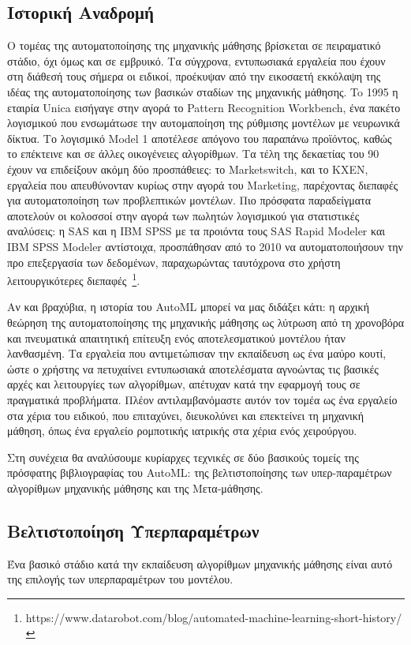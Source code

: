  \subsection{Ιστορική Αναδρομή} \label{section:autohistory}
 Ο τομέας της αυτοματοποίησης της μηχανικής μάθησης βρίσκεται σε πειραματικό στάδιο, όχι όμως και σε εμβρυικό. Τα σύγχρονα, εντυπωσιακά εργαλεία που έχουν στη διάθεσή τους σήμερα οι ειδικοί, προέκυψαν από την εικοσαετή εκκόλαψη της ιδέας της αυτοματοποίησης των βασικών σταδίων της μηχανικής μάθησης. To 1995 η εταιρία Unica εισήγαγε στην αγορά το Pattern Recognition Workbench, ένα πακέτο λογισμικού
 που ενσωμάτωσε την αυτομαποίηση της ρύθμισης μοντέλων με νευρωνικά δίκτυα. Το λογισμικό Model 1 αποτέλεσε απόγονο του παραπάνω προϊόντος, καθώς το επέκτεινε και σε άλλες οικογένειες αλγορίθμων. Τα τέλη της δεκαετίας του 90 έχουν να επιδείξουν ακόμη δύο προσπάθειες: το Marketswitch, και το KXEN, εργαλεία που απευθύνονταν κυρίως στην αγορά του Marketing, παρέχοντας διεπαφές για αυτοματοποίηση των προβλεπτικών μοντέλων. Πιο πρόσφατα παραδείγματα αποτελούν οι κολοσσοί στην αγορά των πωλητών λογισμικού για στατιστικές αναλύσεις: η SAS και η IBM SPSS με τα προιόντα τους SAS Rapid Modeler και IBM SPSS Modeler αντίστοιχα, προσπάθησαν από το 2010 να αυτοματοποιήσουν την προ επεξεργασία των δεδομένων, παραχωρώντας ταυτόχρονα στο χρήστη λειτουργικότερες διεπαφές~\footnote{https://www.datarobot.com/blog/automated-machine-learning-short-history/}.
 
 Αν και βραχύβια, η ιστορία του AutoML μπορεί να μας διδάξει κάτι: η αρχική θεώρηση της αυτοματοποίησης της μηχανικής μάθησης ως λύτρωση  από τη χρονοβόρα και πνευματικά απαιτητική επίτευξη ενός αποτελεσματικού μοντέλου ήταν λανθασμένη. Τα εργαλεία που αντιμετώπισαν την εκπαίδευση ως ένα μαύρο κουτί, ώστε ο χρήστης να πετυχαίνει εντυπωσιακά αποτελέσματα αγνοώντας τις βασικές αρχές και λειτουργίες των αλγορίθμων, απέτυχαν κατά την εφαρμογή τους σε πραγματικά προβλήματα. Πλέον αντιλαμβανόμαστε αυτόν τον τομέα ως ένα εργαλείο στα χέρια του ειδικού, που επιταχύνει, διευκολύνει και επεκτείνει τη μηχανική μάθηση, όπως ένα  εργαλείο ρομποτικής ιατρικής στα χέρια ενός χειρούργου. 
 
 Στη συνέχεια θα αναλύσουμε κυρίαρχες τεχνικές σε δύο βασικούς τομείς της πρόσφατης βιβλιογραφίας του AutoML: της βελτιστοποίησης των υπερ-παραμέτρων αλγορίθμων μηχανικής μάθησης και της Μετα-μάθησης.
 
 \subsection{Βελτιστοποίηση Υπερπαραμέτρων} \label{section:opt}
 	Ένα βασικό στάδιο κατά την εκπαίδευση αλγορίθμων μηχανικής μάθησης είναι αυτό της επιλογής των υπερπαραμέτρων του μοντέλου.
 	
